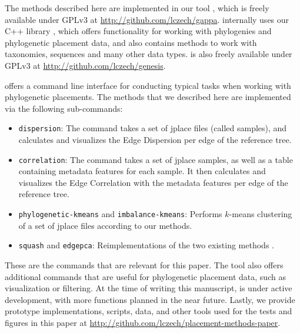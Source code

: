 

The methods described here are implemented in our tool ,
which is freely available under GPLv3 at \url{http://github.com/lczech/gappa}.
 internally uses our C++ library ,
which offers functionality for working with phylogenies and phylogenetic placement data,
and also contains methods to work with taxonomies, sequences and many other data types.
 is also freely available under GPLv3 at \url{http://github.com/lczech/genesis}.

 offers a command line interface for conducting typical tasks when working with phylogenetic placements.
The methods that we described here are implemented via the following sub-commands:

\begin{itemize}
    \item \texttt{dispersion}: The command takes a set of jplace files (called samples), and calculates and visualizes
        the Edge Dispersion per edge of the reference tree.
    \item \texttt{correlation}: The command takes a set of jplace samples, as well as a table containing metadata
        features for each sample. It then calculates and visualizes the Edge Correlation with the metadata features per
        edge of the reference tree.
    \item \texttt{phylogenetic-kmeans} and \texttt{imbalance-kmeans}: Performs $k$-means clustering of a set of jplace
        files according to our methods.
    \item \texttt{squash} and \texttt{edgepca}: Reimplementations of the two existing methods \cite{Matsen2011a,Evans2012}.
\end{itemize}

These are the  commands that are relevant for this paper.
The tool also offers additional commands that are useful for phylogenetic placement data, such as visualization or filtering.
At the time of writing this manuscript,  is under active development,
with more functions planned in the near future.
Lastly, we provide prototype implementations, scripts, data, and other tools
used for the tests and figures in this paper at \url{http://github.com/lczech/placement-methods-paper}.



